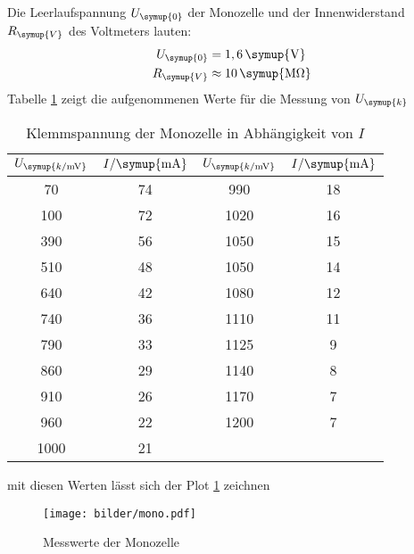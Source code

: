Die Leerlaufspannung $U_\symup{0}$ der Monozelle und der Innenwiderstand
$R_\symup{V}$ des Voltmeters lauten:
\begin{align*}
  U_\symup{0} &= 1,6 \,\symup{\si{\volt}} \\
  R_\symup{V} &\approx 10\,\symup{\si{\mega\ohm}}
\end{align*}
Tabelle \ref{tab:U_k} zeigt die aufgenommenen Werte für die Messung von
$U_\symup{k}$
\begin{table}[H]
  \centering
  \begin{tabular}{c c c c}
    \toprule
    $U_\symup{k/\si{\milli\volt}}$ & $I/\symup{\si{\milli\ampere}}$  &
    $U_\symup{k/\si{\milli\volt}}$ & $I/\symup{\si{\milli\ampere}}$  \\
    \midrule
      70  &  74  &   990  &  18  \\
     100  &  72  &  1020  &  16  \\
     390  &  56  &  1050  &  15  \\
     510  &  48  &  1050  &  14  \\
     640  &  42  &  1080  &  12  \\
     740  &  36  &  1110  &  11  \\
     790  &  33  &  1125  &   9  \\
     860  &  29  &  1140  &   8  \\
     910  &  26  &  1170  &   7  \\
     960  &  22  &  1200  &   7  \\
    1000  &  21  &  \hrulefill  & \hrulefill  \\
    \bottomrule
  \end{tabular}
  \caption{Klemmspannung der Monozelle in Abhängigkeit von $I$}
  \label{tab:U_k}
\end{table}
mit diesen Werten lässt sich der Plot \ref{fig:mono} zeichnen
\begin{figure}[h]
  \centering
  \texttt{[image: bilder/mono.pdf]}
  \caption{Messwerte der Monozelle}
  \label{fig:mono}
\end{figure}
